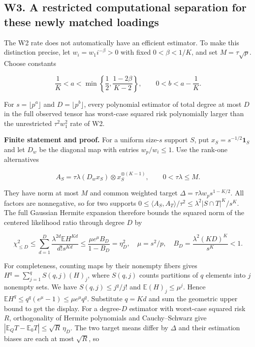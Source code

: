 \documentclass[
  10pt,
]{article}
\begin{document}
\subsection{W3. A restricted computational separation for these newly
matched
loadings}\label{w3.-a-restricted-computational-separation-for-these-newly-matched-loadings}

The W2 rate does not automatically have an efficient estimator. To make
this distinction precise, let \(w_i=w_1i^{-\beta}>0\) with fixed
\(0<\beta<1/K\), and set \(M=\tau\sqrt p\). Choose constants

\[\frac1K<a<\min\left\{\frac12,\frac{1-2\beta}{K-2}\right\},
\qquad 0<b<a-\frac1K.\]

For \(s=\lfloor p^a\rfloor\) and \(D=\lfloor p^b\rfloor\), every
polynomial estimator of total degree at most \(D\) in the full observed
tensor has worst-case squared risk polynomially larger than the
unrestricted \(\tau^2w_1^2\) rate of W2.

\textbf{Finite statement and proof.} For a uniform size-\(s\) support
\(S\), put \(x_S=s^{-1/2}\mathbf1_S\) and let \(D_w\) be the diagonal
map with entries \(w_p/w_i\le1\). Use the rank-one alternatives

\[A_S=\tau\lambda(D_wx_S)\otimes x_S^{\otimes(K-1)},\qquad
0<\tau\lambda\le M.\]

They have norm at most \(M\) and common weighted target
\(\Delta=\tau\lambda w_p s^{1-K/2}\). All factors are nonnegative, so
for two supports \(0\le\langle A_S,A_T\rangle/\tau^2\le
\lambda^2|S\cap T|^K/s^K\). The full Gaussian Hermite expansion
therefore bounds the squared norm of the centered likelihood ratio
through degree \(D\) by

\[\chi^2_{\le D}\le\sum_{d=1}^D
\frac{\lambda^{2d}\mathbb E H^{Kd}}{d!s^{Kd}}
\le\frac{\mu e^\mu B_D}{1-B_D}=\eta_D^2,
\quad \mu=s^2/p,\quad B_D=\frac{\lambda^2(KD)^K}{s^K}<1.\]

For completeness, counting maps by their nonempty fibers gives
\(H^q=\sum_{j=1}^q S(q,j)(H)_j\), where \(S(q,j)\) counts partitions of
\(q\) elements into \(j\) nonempty sets. We have \(S(q,j)\le j^q/j!\)
and \(\mathbb E(H)_j\le\mu^j\). Hence
\(\mathbb E H^q\le q^q(e^\mu-1)\le\mu e^\mu q^q\). Substitute \(q=Kd\)
and sum the geometric upper bound to get the display. For a degree-\(D\)
estimator with worst-case squared risk \(R\), orthogonality of Hermite
polynomials and Cauchy--Schwarz give
\(|\mathbb E_QT-\mathbb E_0T|\le\sqrt R\,\eta_D\). The two target means
differ by \(\Delta\) and their estimation biases are each at most
\(\sqrt R\), so
\end{document}
